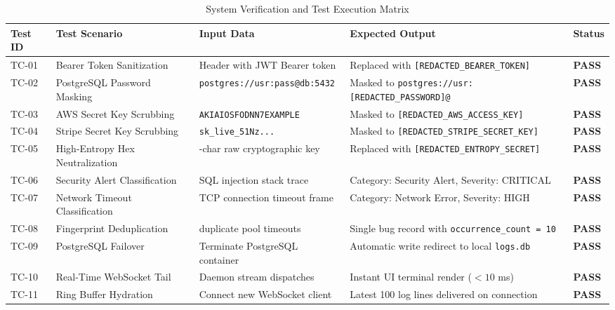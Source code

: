 \documentclass[12pt,a4paper]{article}
\begin{document}
\begin{table}[H]
\centering
\caption{System Verification and Test Execution Matrix}
\label{tab:test_execution_matrix_full}
\renewcommand{\arraystretch}{1.25}
\begin{tabularx}{\textwidth}{|>{\centering\arraybackslash}p{1.2cm}|>{\raggedright\arraybackslash}p{3.2cm}|>{\raggedright\arraybackslash}p{3.5cm}|>{\raggedright\arraybackslash}X|>{\centering\arraybackslash}p{1.2cm}|}
\hline
\textbf{Test ID} & \textbf{Test Scenario} & \textbf{Input Data} & \textbf{Expected Output} & \textbf{Status} \\
\hline
TC-01 & Bearer Token Sanitization & Header with JWT Bearer token & Replaced with \texttt{[REDACTED\_BEARER\_TOKEN]} & \textbf{PASS} \\
\hline
TC-02 & PostgreSQL Password Masking & \texttt{postgres://usr:pass@db:5432} & Masked to \texttt{postgres://usr:[REDACTED\_PASSWORD]@} & \textbf{PASS} \\
\hline
TC-03 & AWS Secret Key Scrubbing & \texttt{AKIAIOSFODNN7EXAMPLE} & Masked to \texttt{[REDACTED\_AWS\_ACCESS\_KEY]} & \textbf{PASS} \\
\hline
TC-04 & Stripe Secret Key Scrubbing & \texttt{sk\_live\_51Nz...} & Masked to \texttt{[REDACTED\_STRIPE\_SECRET\_KEY]} & \textbf{PASS} \\
\hline
TC-05 & High-Entropy Hex Neutralization & 64-char raw cryptographic key & Replaced with \texttt{[REDACTED\_ENTROPY\_SECRET]} & \textbf{PASS} \\
\hline
TC-06 & Security Alert Classification & SQL injection stack trace & Category: Security Alert, Severity: CRITICAL & \textbf{PASS} \\
\hline
TC-07 & Network Timeout Classification & TCP connection timeout frame & Category: Network Error, Severity: HIGH & \textbf{PASS} \\
\hline
TC-08 & Fingerprint Deduplication & 10 duplicate pool timeouts & Single bug record with \texttt{occurrence\_count = 10} & \textbf{PASS} \\
\hline
TC-09 & PostgreSQL Failover & Terminate PostgreSQL container & Automatic write redirect to local \texttt{logs.db} & \textbf{PASS} \\
\hline
TC-10 & Real-Time WebSocket Tail & Daemon stream dispatches & Instant UI terminal render ($< 10$ ms) & \textbf{PASS} \\
\hline
TC-11 & Ring Buffer Hydration & Connect new WebSocket client & Latest 100 log lines delivered on connection & \textbf{PASS} \\

\end{tabularx}
\end{table}
\end{document}
